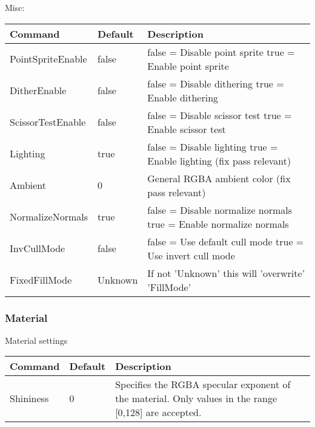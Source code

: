 Misc:\\
\begin{tabular}{|p{4.5cm}|p{3cm}|p{9cm}|}
\hline
\textbf{Command} & \textbf{Default} & \textbf{Description}\\
\hline
PointSpriteEnable & false  & false = Disable point sprite\newline
                             true  = Enable point sprite\\
DitherEnable      & false  & false = Disable dithering\newline
                             true  = Enable dithering\\
\hline
ScissorTestEnable & false  & false = Disable scissor test\newline
                             true  = Enable scissor test\\
\hline
Lighting          & true   &  false = Disable lighting\newline
                              true  = Enable lighting\newline
                              (fix pass relevant)\\
Ambient           & 0      &  General RGBA ambient color\newline
                              (fix pass relevant)\\
\hline
NormalizeNormals  & true   & false = Disable normalize normals\newline
                             true  = Enable normalize normals\\
\hline
InvCullMode       & false  & false = Use default cull mode\newline
                             true  = Use invert cull mode\\
\hline
FixedFillMode    & Unknown & If not 'Unknown' this will 'overwrite' 'FillMode'\\
\hline
\end{tabular}

        

\subsubsection{Material}
Material settings\\
	
\begin{tabular}{|p{2.5cm}|p{2.5cm}|p{9cm}|}
\hline
\textbf{Command} & \textbf{Default} & \textbf{Description}\\
\hline
Shininess & 0 & Specifies the RGBA specular exponent of the material. Only values in the range [0,128] are accepted.\\
\hline
\end{tabular}


